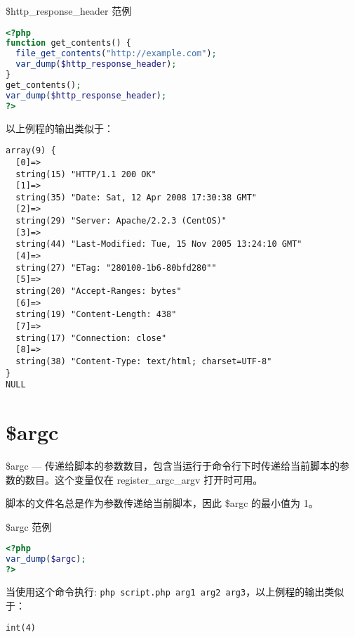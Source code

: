 \begin{example}
\$http\_response\_header 范例
\begin{lstlisting}[language=PHP]
<?php
function get_contents() {
  file_get_contents("http://example.com");
  var_dump($http_response_header);
}
get_contents();
var_dump($http_response_header);
?>
\end{lstlisting}
\end{example}

以上例程的输出类似于：

\begin{verbatim}
array(9) {
  [0]=>
  string(15) "HTTP/1.1 200 OK"
  [1]=>
  string(35) "Date: Sat, 12 Apr 2008 17:30:38 GMT"
  [2]=>
  string(29) "Server: Apache/2.2.3 (CentOS)"
  [3]=>
  string(44) "Last-Modified: Tue, 15 Nov 2005 13:24:10 GMT"
  [4]=>
  string(27) "ETag: "280100-1b6-80bfd280""
  [5]=>
  string(20) "Accept-Ranges: bytes"
  [6]=>
  string(19) "Content-Length: 438"
  [7]=>
  string(17) "Connection: close"
  [8]=>
  string(38) "Content-Type: text/html; charset=UTF-8"
}
NULL
\end{verbatim}






\section{\$argc}


\$argc — 传递给脚本的参数数目，包含当运行于命令行下时传递给当前脚本的参数的数目。这个变量仅在 register\_argc\_argv 打开时可用。

脚本的文件名总是作为参数传递给当前脚本，因此 \$argc 的最小值为 1。



\begin{example}
\$argc 范例
\begin{lstlisting}[language=PHP]
<?php
var_dump($argc);
?>
\end{lstlisting}
\end{example}

当使用这个命令执行: \verb|php script.php arg1 arg2 arg3|，以上例程的输出类似于：

\begin{verbatim}
int(4)
\end{verbatim}



\begin{example}

\begin{lstlisting}[language=PHP]

\end{lstlisting}
\end{example}

